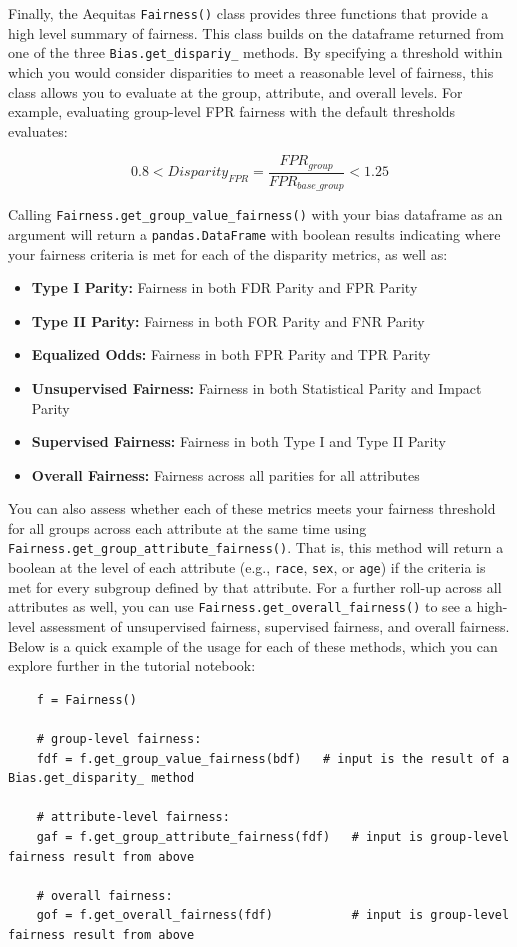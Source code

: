 \documentclass[]{krantz}
\begin{document}
Finally, the Aequitas \texttt{Fairness()} class provides three functions
that provide a high level summary of fairness. This class builds on the
dataframe returned from one of the three \texttt{Bias.get\_dispariy\_}
methods. By specifying a threshold within which you would consider
disparities to meet a reasonable level of fairness, this class allows
you to evaluate at the group, attribute, and overall levels. For
example, evaluating group-level FPR fairness with the default thresholds
evaluates:

\[0.8 < Disparity_{FPR} = \frac{FPR_{group}}{FPR_{base\_group}} < 1.25\]

Calling \texttt{Fairness.get\_group\_value\_fairness()} with your bias
dataframe as an argument will return a \texttt{pandas.DataFrame} with
boolean results indicating where your fairness criteria is met for each
of the disparity metrics, as well as:

\begin{itemize}
\item
  \textbf{Type I Parity:} Fairness in both FDR Parity and FPR Parity
\item
  \textbf{Type II Parity:} Fairness in both FOR Parity and FNR Parity
\item
  \textbf{Equalized Odds:} Fairness in both FPR Parity and TPR Parity
\item
  \textbf{Unsupervised Fairness:} Fairness in both Statistical Parity
  and Impact Parity
\item
  \textbf{Supervised Fairness:} Fairness in both Type I and Type II
  Parity
\item
  \textbf{Overall Fairness:} Fairness across all parities for all
  attributes
\end{itemize}

You can also assess whether each of these metrics meets your fairness
threshold for all groups across each attribute at the same time using
\texttt{Fairness.get\_group\_attribute\_fairness()}. That is, this
method will return a boolean at the level of each attribute (e.g.,
\texttt{race}, \texttt{sex}, or \texttt{age}) if the criteria is met for
every subgroup defined by that attribute. For a further roll-up across
all attributes as well, you can use
\texttt{Fairness.get\_overall\_fairness()} to see a high-level
assessment of unsupervised fairness, supervised fairness, and overall
fairness. Below is a quick example of the usage for each of these
methods, which you can explore further in the tutorial notebook:

\begin{verbatim}
    f = Fairness()

    # group-level fairness:
    fdf = f.get_group_value_fairness(bdf)   # input is the result of a Bias.get_disparity_ method
    
    # attribute-level fairness:
    gaf = f.get_group_attribute_fairness(fdf)   # input is group-level fairness result from above
    
    # overall fairness:
    gof = f.get_overall_fairness(fdf)           # input is group-level fairness result from above
\end{verbatim}
\end{document}
